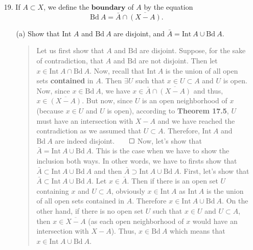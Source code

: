 \documentclass[12pt, a4paper]{article}
\begin{document}
\begin{itemize}
\item[]
\item[]

\item[19.]
If $A \subset X$, we define the $\textbf{boundary}$ of $A$ by the equation
$$\mbox{Bd} \ A = \bar{A} \cap \overline{(X - A)}.$$
\begin{itemize}
\item[(a)]
Show that Int $A$ and $\mbox{Bd} \ A$ are disjoint, and $\bar{A} = \mbox{Int} \ A \cup \mbox{Bd} \ A$.
\begin{quote}
Let us first show that $A$ and $\mbox{Bd}$ are disjoint.
\newline
\newline
Suppose, for the sake of contradiction, that $A$ and $\mbox{Bd}$ are not disjoint.
Then let $x \in \mbox{Int} \ A \cap \mbox{Bd} \ A$. Now, recall that $\mbox{Int} \ A$
is the union of all open sets \textbf{contained} in $A$. Then $\exists U$ such
that $x \in U \subset A$ and $U$ is open. Now, since $x \in \mbox{Bd} \ A$,
we have $x \in \bar{A} \cap \overline{(X - A)}$ and thus, $x \in \overline{(X - A)}$.
But now, since $U$ is an open neighborhood of $x$ (because $x \in U$ and $U$ is open),
according to \textbf{Theorem 17.5}, $U$ must have an intersection with $X - A$ and we have
reached the contradiction as we assumed that $U \subset A$. Therefore, 
$\mbox{Int} \ A$ and $\mbox{Bd} \ A$ are indeed disjoint.$\qed$
\newline
\newline
Now, let's show that $\bar{A} = \mbox{Int} \ A \cup \mbox{Bd} \ A$.
\newline
\newline
This is the case when we have to show the inclusion both ways.
In other words, we have to firsts show that $\bar{A} \subset \mbox{Int} \ A \cup \mbox{Bd} \ A$
and then $\bar{A} \supset \mbox{Int} \ A \cup \mbox{Bd} \ A$.
\newline
\newline
First, let's show that $\bar{A} \subset \mbox{Int} \ A \cup \mbox{Bd} \ A$.
Let $x \in \bar{A}$. Then if there is an open set $U$ containing $x$ and $U \subset A$, obviously
$x \in \mbox{Int} \ A$ as $\mbox{Int} \ A$ is the union of all open sets contained in $A$. Therefore $x \in \mbox{Int} \ A \cup \mbox{Bd} \ A$.
On the other hand, if there is no open set $U$ such that $x \in U$ and $U \subset A$,
then $x \in \overline{X - A}$ (as each open neighborhood of $x$ would have an intersection with $X - A$).
Thus, $x \in \mbox{Bd} \ A$ which means that $x \in \mbox{Int} \ A \cup \mbox{Bd} \ A$.

\end{quote}
\end{itemize}
\end{itemize}
\end{document}
